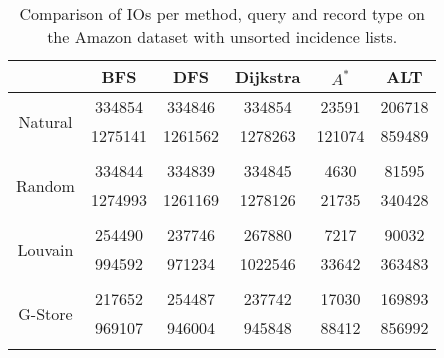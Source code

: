 \begin{table}
	\begin{center}
		 \begin{tabular}[c]{c c c c c c} \toprule
			  & BFS & DFS & Dijkstra & $A^*$  & ALT \\ \midrule 
 			\multirow{2}{*}{Natural}  & 334854 & 334846 & 334854 & 23591 & 206718 \\ 
 				 & 1275141 & 1261562 & 1278263 & 121074 & 859489 \\ 
 				&&&&& \\[-0.5em]
 			\multirow{2}{*}{Random}  & 334844 & 334839 & 334845 & 4630 & 81595 \\ 
 				 & 1274993 & 1261169 & 1278126 & 21735 & 340428 \\ 
 				&&&&& \\[-0.5em]
 			\multirow{2}{*}{Louvain}  & 254490 & 237746 & 267880 & 7217 & 90032 \\ 
 				 & 994592 & 971234 & 1022546 & 33642 & 363483 \\ 
 				&&&&& \\[-0.5em]
 			\multirow{2}{*}{G-Store}  & 217652 & 254487 & 237742 & 17030 & 169893 \\ 
 				 & 969107 & 946004 & 945848 & 88412 & 856992 \\ 
 				&&&&& \\[-0.5em]
 					\end{tabular}  
  	 \end{center}
	 \caption{Comparison of IOs per method, query and record type on the Amazon dataset with unsorted incidence lists.}
	 \label{amazon-uns}
\end{table}
